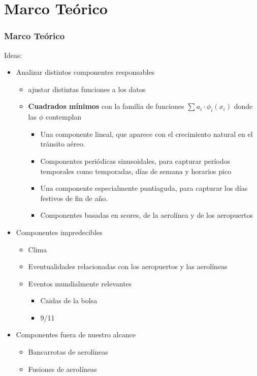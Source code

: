 \documentclass{beamer}
\begin{document}
\section{Marco Teórico}\label{sec:marco-teórico}
\begin{frame}
\frametitle{Marco Teórico}

Ideas:
\begin{itemize}
	\item<1-> Analizar distintos componentes responsables
	\begin{itemize}
		\item<2-> ajustar distintas funciones a los datos
		\item<3-> \textbf{Cuadrados mínimos} con la familia de funciones $\sum a_i \cdot \phi_i(x_i)$ donde las $\phi$ contemplan
		\begin{itemize}	
			\item<4-> Una componente lineal, que aparece con el crecimiento natural en el tránsito aéreo.
			\item<5-> Componentes periódicas sinusoidales, para capturar períodos temporales como temporadas, días de semana y horarios pico
			\item<6-> Una componente especialmente puntiaguda, para capturar los días festivos de fin de año.
			\item<7-> Componentes basadas en scores, de la aerolínea y de los aeropuertos
		\end{itemize}
	\end{itemize}
\end{itemize}
\end{frame}
\begin{frame}
\begin{itemize}
	\item<1-> Componentes impredecibles
	\begin{itemize}
		\item<1-> Clima
		\item<1-> Eventualidades relacionadas con los aeropuertos y las aerolíneas
		\item<1-> Eventos mundialmente relevantes
		\begin{itemize}
			\item<2-> Caidas de la bolsa
			\item<2-> 9/11
		\end{itemize}
	\end{itemize}
	\item<3-> Componentes fuera de nuestro alcance
	\begin{itemize}
		\item<3-> Bancarrotas de aerolíneas
		\item<3-> Fusiones de aerolíneas
	\end{itemize}
\end{itemize}

\end{frame}
\end{document}
